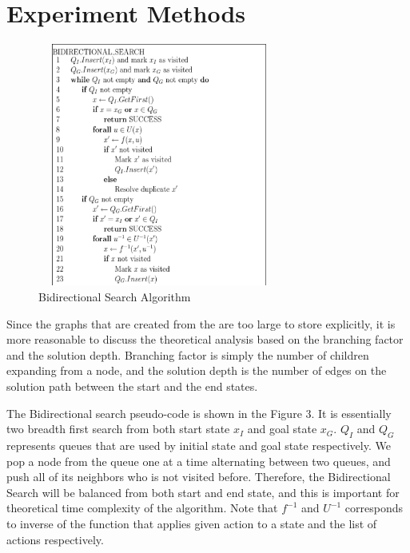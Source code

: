 \documentclass[conference]{IEEEtran}
\begin{document}


\section{Experiment Methods}

\begin{figure}[!t]
\includegraphics[width=8cm, height=8cm]{BI_Pseudocode}
\centering
\caption{Bidirectional Search Algorithm}
\end{figure}

Since the graphs that are created from the are too large to store explicitly, it is more reasonable to discuss the theoretical analysis based on the branching factor and the solution depth. Branching factor is simply the number of children expanding from a node, and the solution depth is the number of edges on the solution path between the start and the end states.

The Bidirectional search pseudo-code is shown in the Figure 3. It is essentially two breadth first search from both start state $x_I$ and goal state $x_G$. $Q_I$ and $Q_G$ represents queues that are used by initial state and goal state respectively. We pop a node from the queue one at a time alternating between two queues, and push all of its neighbors who is not visited before. Therefore, the Bidirectional Search will be balanced from both start and end state, and this is important for theoretical time complexity of the algorithm. Note that $f^{-1}$ and $U^{-1}$ corresponds to inverse of the function that applies given action to a state and the list of actions respectively.
\end{document}
